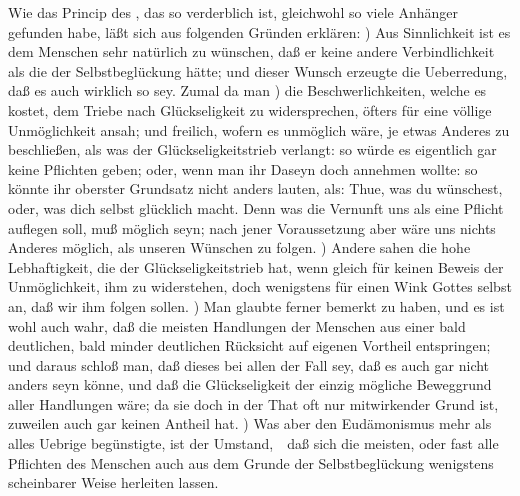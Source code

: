 \begin{RWanm}
\begin{aufzb}
\item Wie das Princip des , das so verderblich ist, gleichwohl so viele Anhänger gefunden habe, läßt sich aus folgenden Gründen erklären: ) Aus Sinnlichkeit ist es dem Menschen sehr natürlich zu wünschen, daß er keine andere Verbindlichkeit als die der Selbstbeglückung hätte; und dieser Wunsch erzeugte die Ueberredung, daß es auch wirklich so sey. Zumal da man ) die Beschwerlichkeiten, welche es kostet, dem Triebe nach Glückseligkeit zu widersprechen, öfters für eine völlige Unmöglichkeit ansah; und freilich, wofern es unmöglich wäre, je etwas Anderes zu beschließen, als was der Glückseligkeitstrieb verlangt: so würde es eigentlich gar keine Pflichten geben; oder, wenn man ihr Daseyn doch annehmen wollte: so könnte ihr oberster Grundsatz nicht anders lauten, als: Thue, was du wünschest, oder, was dich selbst glücklich macht. Denn was die Vernunft uns als eine Pflicht auflegen soll, muß möglich seyn; nach jener Voraussetzung aber wäre uns nichts Anderes möglich, als unseren Wünschen zu folgen. ) Andere sahen die hohe Lebhaftigkeit, die der Glückseligkeitstrieb hat, wenn gleich für keinen Beweis der Unmöglichkeit, ihm zu widerstehen, doch wenigstens für einen Wink Gottes selbst an, daß wir ihm folgen sollen. ) Man glaubte ferner bemerkt zu haben, und es ist wohl auch wahr, daß die meisten Handlungen der Menschen aus einer bald deutlichen, bald minder deutlichen Rücksicht auf eigenen Vortheil entspringen; und daraus schloß man, daß dieses bei allen der Fall sey, daß es auch gar nicht anders seyn könne, und daß die Glückseligkeit der einzig mögliche Beweggrund aller Handlungen wäre; da sie doch in der That oft nur mitwirkender Grund ist, zuweilen auch gar keinen Antheil hat. ) Was aber den Eudämonismus mehr als alles Uebrige begünstigte, ist der Umstand,~\ daß sich die meisten, oder fast alle Pflichten des Menschen auch aus dem Grunde der Selbstbeglückung wenigstens scheinbarer Weise herleiten lassen. 
\end{aufzb}
\end{RWanm}

